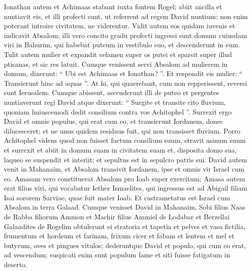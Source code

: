 \begin{biblechapter}
\begin{biblechapter}
\begin{biblechapter}
\begin{biblechapter}
\begin{biblechapter}
\begin{biblechapter}
\begin{biblechapter}
\begin{biblechapter}
\begin{biblechapter}
\begin{biblechapter}
\begin{biblechapter}
\begin{biblechapter}
\begin{biblechapter}
\begin{biblechapter}
\begin{biblechapter}
\begin{biblechapter}
\begin{biblechapter}
 \verse Ionathan autem et Achimaas stabant iuxta fontem Rogel; abiit ancilla et nuntiavit eis, et illi profecti sunt, ut referrent ad regem David nuntium; non enim poterant introire civitatem, ne viderentur. 
\verse Vidit autem eos quidam iuvenis et indicavit Absalom; illi vero concito gradu profecti ingressi sunt domum cuiusdam viri in Bahurim, qui habebat puteum in vestibulo suo, et descenderunt in eum. 
\verse Tulit autem mulier et expandit velamen super os putei et sparsit super illud ptisanas, et sic res latuit. 
\verse Cumque venissent servi Absalom ad mulierem in domum, dixerunt: “ Ubi est Achimaas et Ionathan? ”. Et respondit eis mulier: “ Transierunt hinc ad aquas ”. At hi, qui quaerebant, cum non repperissent, reversi sunt Ierusalem.
 \verse Cumque abissent, ascenderunt illi de puteo et pergentes nuntiaverunt regi David atque dixerunt: “ Surgite et transite cito fluvium, quoniam huiuscemodi dedit consilium contra vos Achitophel ”. 
\verse Surrexit ergo David et omnis populus, qui erat cum eo, et transierunt Iordanem, donec dilucesceret; et ne unus quidem residuus fuit, qui non transisset fluvium.
 \verse Porro Achitophel videns quod non fuisset factum consilium suum, stravit asinum suum et surrexit et abiit in domum suam in civitatem suam et, disposita domo sua, laqueo se suspendit et interiit; et sepultus est in sepulcro patris sui.
 \verse David autem venit in Mahanaim, et Absalom transivit Iordanem, ipse et omnis vir Israel cum eo. 
\verse Amasam vero constituerat Absalom pro Ioab super exercitum; Amasa autem erat filius viri, qui vocabatur Iether Ismaelites, qui ingressus est ad Abigail filiam Isai sororem Sarviae, quae fuit mater Ioab. 
 \verse Et castrametatus est Israel cum Absalom in terra Galaad.
 \verse Cumque venisset David in Mahanaim, Sobi filius Naas de Rabba filiorum Ammon et Machir filius Ammiel de Lodabar et Berzellai Galaadites de Rogelim 
\verse obtulerunt ei stratoria et tapetia et pelves et vasa fictilia, frumentum et hordeum et farinam, frixum cicer et fabam et lentem 
\verse et mel et butyrum, oves et pingues vitulos; dederuntque David et populo, qui cum eo erat, ad vescendum; suspicati enim sunt populum fame et siti fuisse fatigatum in deserto.
 

\end{biblechapter}
\end{biblechapter}
\end{biblechapter}
\end{biblechapter}
\end{biblechapter}
\end{biblechapter}
\end{biblechapter}
\end{biblechapter}
\end{biblechapter}
\end{biblechapter}
\end{biblechapter}
\end{biblechapter}
\end{biblechapter}
\end{biblechapter}
\end{biblechapter}
\end{biblechapter}
\end{biblechapter}
